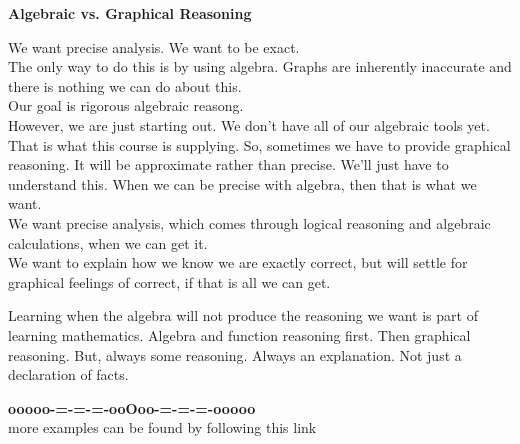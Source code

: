 \documentclass{ximera}
\begin{document}
\begin{warning}  \textbf{\textcolor{blue!55!black}{Algebraic vs. Graphical Reasoning}}


We want precise analysis.  We want to be exact. \\


The only way to do this is by using algebra.  Graphs are inherently inaccurate and there is nothing we can do about this. \\


Our goal is rigorous algebraic reasong. \\



However, we are just starting out.  We don't have all of our algebraic tools yet.  That is what this course is supplying.  So, sometimes we have to provide graphical reasoning.  It will be approximate rather than precise.  We'll just have to understand this.  When we can be precise with algebra, then that is what we want. \\


We want precise analysis, which comes through logical reasoning and algebraic calculations, when we can get it. \\


We want to explain how we know we are exactly correct, but will settle for graphical feelings of correct, if that is all we can get. \\


\end{warning}



Learning when the algebra will not produce the reasoning we want is part of learning mathematics.  Algebra and function reasoning first. Then graphical reasoning.  But, always some reasoning.  Always an explanation. Not just a declaration of facts.








\begin{center}
\textbf{\textcolor{green!50!black}{ooooo-=-=-=-ooOoo-=-=-=-ooooo}} \\

more examples can be found by following this link\\ 

\end{center}
\end{document}
